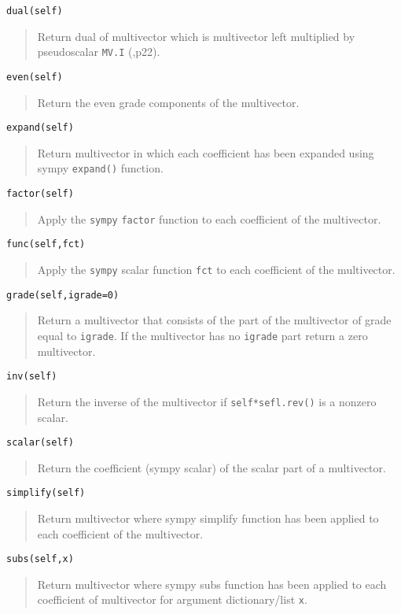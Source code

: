 \documentclass[10pt]{article}
\newcommand{\T}[1]{\texttt{#1}}
\begin{document}
\T{dual(self)}
\begin{quote}
   Return dual of multivector which is multivector left multiplied by
   pseudoscalar \T{MV.I} (\cite{Hestenes},p22).
\end{quote}

\T{even(self)}
\begin{quote}
   Return the even grade components of the multivector.
\end{quote}

\T{expand(self)}
\begin{quote}
   Return multivector in which each coefficient has been expanded using
   sympy \T{expand()} function.
\end{quote}

\T{factor(self)}
\begin{quote}
   Apply the \T{sympy} \T{factor} function to each coefficient of the multivector.
\end{quote}

\T{func(self,fct)}
\begin{quote}
   Apply the \T{sympy} scalar function \T{fct} to each coefficient of the multivector.
\end{quote}

\T{grade(self,igrade=0)}
\begin{quote}
    Return a multivector that consists of the part of the multivector of
    grade equal to \T{igrade}.  If the multivector has no \T{igrade} part
    return a zero multivector.
\end{quote}

\T{inv(self)}
\begin{quote}
   Return the inverse of the multivector if \T{self*sefl.rev()} is a nonzero scalar.
\end{quote}

\T{scalar(self)}
\begin{quote}
    Return the coefficient (sympy scalar) of the scalar part of a
    multivector.
\end{quote}

\T{simplify(self)}
\begin{quote}
   Return multivector where sympy simplify function has been applied to
   each coefficient of the multivector.
\end{quote}

\T{subs(self,x)}
\begin{quote}
   Return multivector where sympy subs function has been applied to each
   coefficient of multivector for argument dictionary/list \T{x}.
\end{quote}
\end{document}
